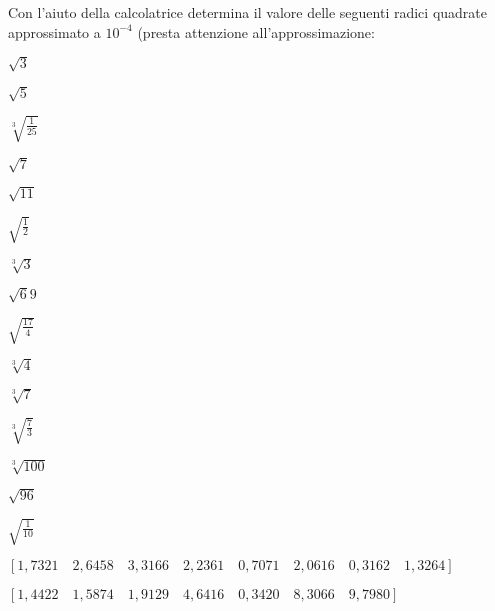 \begin{esercizio}
 \label{ese:2.03}
Con l'aiuto della calcolatrice determina il valore delle seguenti radici 
quadrate approssimato a $10^{-4}$ (presta attenzione all'approssimazione:
\vspace{-.7em}
 \begin{multicols}{5}
 \begin{enumeratea}
 \item $\sqrt 3$
 \item $\sqrt 5$
 \item $\sqrt[3]{\frac{1}{25}}$
 \item $\sqrt 7$
 \item $\sqrt{11}$
 \item $\sqrt{\frac 1 2}$
 \item $\sqrt[3]3$
 \item $\sqrt 69$
 \item $\sqrt{\frac{17} 4}$
 \item $\sqrt[3]4$
 \item $\sqrt[3]7$
 \item $\sqrt[3]{\frac{7}{3}}$
 \item $\sqrt[3]{100}$
 \item $\sqrt{96}$
 \item $\sqrt{\frac{1}{10}}$
 \end{enumeratea}
 \end{multicols}
\begin{flushright}
\vspace*{-8pt}
$[1,7321 \quad 2,6458 \quad 3,3166 \quad 2,2361 \quad 0,7071 \quad 
  2,0616 \quad 0,3162 \quad 1,3264]$ 
  
$[1,4422 \quad 1,5874 \quad 1,9129 \quad
  4,6416 \quad 0,3420 \quad 8,3066 \quad 9,7980]$ %
\end{flushright}
\end{esercizio}
\vspace{-1.0em}


